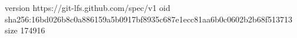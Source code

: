 version https://git-lfs.github.com/spec/v1
oid sha256:16bd026b8c0a886159a5b0917bf8935c687e1ecc81aa6b0c0602b2b68f513713
size 174916
